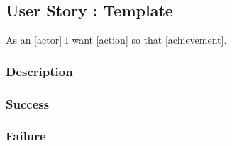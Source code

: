\subsection{User Story : Template}
As an [actor] I want [action] so that [achievement].

\subsubsection{Description}

\subsubsection{Success}

\subsubsection{Failure}